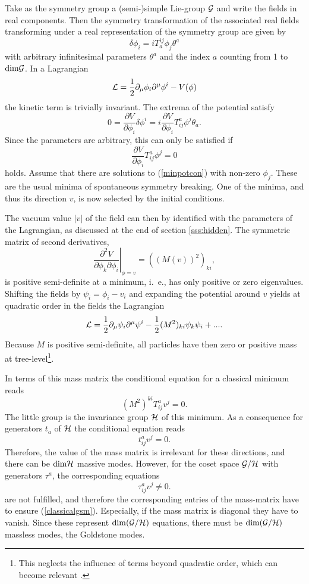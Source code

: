 \documentclass[final,12pt]{article}
\newcommand*{\La}{{\cal{L}}}
\newcommand*{\no}{\noindent}
\newcommand*{\be}{\begin{equation}}
\newcommand*{\ee}{\end{equation}}
\newcommand*{\pd}{\partial}
\newcommand*{\pdm}{\pd_{\mu}}
\newcommand*{\pref}[1]{(\ref{#1})}
\newcommand*{\nn}{\nonumber}
\newcommand*{\1}{1\!\!\!\bot}
\begin{document}
Take as the symmetry group a (semi-)simple Lie-group ${\cal G}$ and write the fields in real components. Then the symmetry transformation of the associated real fields transforming under a real representation of the symmetry group are given by
\be
\delta\phi_i=iT^{ij}_a\phi_j\theta^a
\ee
\no with arbitrary infinitesimal parameters $\theta^a$ and the index $a$ counting from 1 to $\mathrm{dim}{\cal G}$. In a Lagrangian
\be
\La=\frac{1}{2}\pdm\phi_i\pd^\mu\phi^i-V(\phi)\nn
\ee
\no the kinetic term is trivially invariant. The extrema of the potential satisfy
\be
0=\frac{\pd V}{\pd\phi_i}\delta\phi^i=i\frac{\pd V}{\pd\phi_i} T_{ij}^a\phi^j\theta_a\nn.
\ee
\no Since the parameters are arbitrary, this can only be satisfied if
\be
\frac{\pd V}{\pd\phi_i}T_{ij}^a\phi^j=0\label{minpotcon}
\ee
\no holds. Assume that there are solutions to \pref{minpotcon} with non-zero $\phi_j$. These are the usual minima of spontaneous symmetry breaking. One of the minima, and thus its direction $v$, is now selected by the initial conditions.

The vacuum value $|v|$ of the field can then by identified with the parameters of the Lagrangian, as discussed at the end of section \ref{sss:hidden}. The symmetric matrix of second derivatives,
\be
\left.\frac{\pd^2 V}{\pd\phi_k\pd\phi_i}\right|_{\phi=v}=((M(v))^2)_{ki}\nn,
\ee
\no is positive semi-definite at a minimum, i.\ e., has only positive or zero eigenvalues. Shifting the fields by $\psi_i=\phi_i-v_i$ and expanding the potential around $v$ yields at quadratic order in the fields the Lagrangian
\be
\La=\frac{1}{2}\pd_\mu\psi_i\pd^\mu\psi^i-\frac{1}{2}(M^2)_{ki}\psi_k\psi_i+...\nn.
\ee
\no Because $M$ is positive semi-definite, all particles have then zero or positive mass at tree-level\footnote{This neglects the influence of terms beyond quadratic order, which can become relevant \cite{Strocchi:2005yk}.}.

In terms of this mass matrix the conditional equation for a classical minimum reads
\be
(M^2)^{ki} T^a_{ij} v^j=0\label{classicalgsm}.
\ee
\no The little group is the invariance group ${\cal H}$ of this minimum. As a consequence for generators $t_a$ of ${\cal H}$ the conditional equation reads
\be
t^a_{ij}v^j=0\nn.
\ee
\no Therefore, the value of the mass matrix is irrelevant for these directions, and there can be $\mathrm{dim}{\cal H}$ massive modes. However, for the coset space ${\cal G}/{\cal H}$ with generators $\tau^a$, the corresponding equations
\be
\tau^a_{ij}v^j\neq 0\nn.
\ee
\no are not fulfilled, and therefore the corresponding entries of the mass-matrix have to ensure \pref{classicalgsm}. Especially, if the mass matrix is diagonal they have to vanish. Since these represent $\mathrm{dim}({\cal G}/{\cal H})$ equations, there must be $\mathrm{dim}({\cal G}/{\cal H})$ massless modes, the Goldstone modes.
\end{document}
